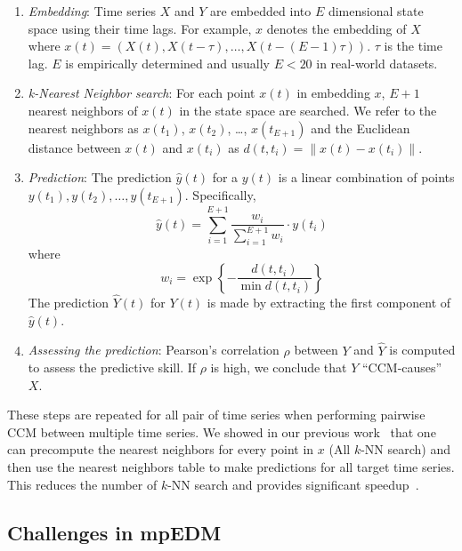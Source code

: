 \documentclass[sigconf]{acmart}
\begin{document}
\begin{enumerate}
    \item \textit{Embedding}: Time series $X$ and $Y$ are embedded into
        $E$ dimensional state space using their time lags. For example,
        $x$ denotes the embedding of $X$ where $x(t)=(X(t), X(t-\tau),
        \dots, X(t-(E-1) \tau))$. $\tau$ is the time lag. $E$ is
        empirically determined and usually $E<20$ in real-world datasets.
    \item \textit{k-Nearest Neighbor search}: For each point $x(t)$ in
        embedding $x$, $E+1$ nearest neighbors of $x(t)$ in the state space
        are searched. We refer to the nearest neighbors as $x(t_1)$, $x(t_2)$,
        \dots, $x(t_{E+1})$ and the Euclidean distance between $x(t)$ and
        $x(t_i)$ as $d(t, t_i) =\lVert x(t) - x(t_i) \rVert$.
    \item \textit{Prediction}: The prediction $\hat{y}(t)$ for a $y(t)$ is a
        linear combination of points $y(t_1), y(t_2), \dots, y(t_{E+1})$.
        Specifically,
        \begin{equation*}
            \hat{y}(t) = \sum^{E+1}_{i=1} \frac{w_i}{\sum^{E+1}_{i=1}{w_i}} \cdot y(t_i)
        \end{equation*}
        where
        \begin{equation*}
            w_i = \exp\left\{ -\frac{d(t, t_i)}{\min{d(t, t_i)}}\right\}
        \end{equation*}
        The prediction $\hat{Y}(t)$ for $Y(t)$ is made by extracting the first
        component of $\hat{y}(t)$.
    \item \textit{Assessing the prediction}: Pearson's correlation $\rho$
        between $Y$ and $\hat{Y}$ is computed to assess the predictive skill.
        If $\rho$ is high, we conclude that $Y$ ``CCM-causes'' $X$.
\end{enumerate}

These steps are repeated for all pair of time series when performing
pairwise CCM between multiple time series. We showed in our previous
work~\cite{mpedm} that one can precompute the nearest neighbors for every
point in $x$ (All $k$-NN search) and then use the nearest neighbors table to
make predictions for all target time series. This reduces the number of $k$-NN
search and provides significant speedup~\cite{mpedm}.

\subsection{Challenges in mpEDM}\label{sec:challenges}
\end{document}
